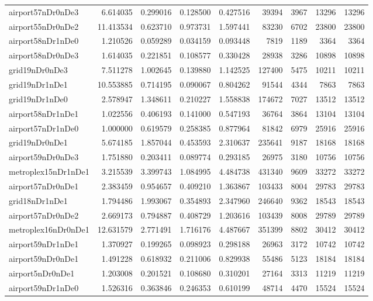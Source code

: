 \begin{longtable}{|l|r|r|r|r|r|r|r|r|}
airport57nDr0nDe3 & 6.614035 & 0.299016 & 0.128500 & 0.427516 & 39394 & 3967 & 13296 & 13296 \\
airport55nDr0nDe2 & 11.413534 & 0.623710 & 0.973731 & 1.597441 & 83230 & 6702 & 23800 & 23800 \\
airport58nDr1nDe0 & 1.210526 & 0.059289 & 0.034159 & 0.093448 & 7819 & 1189 & 3364 & 3364 \\
airport58nDr0nDe3 & 1.614035 & 0.221851 & 0.108577 & 0.330428 & 28938 & 3286 & 10898 & 10898 \\
grid19nDr0nDe3 & 7.511278 & 1.002645 & 0.139880 & 1.142525 & 127400 & 5475 & 10211 & 10211 \\
grid19nDr1nDe1 & 10.553885 & 0.714195 & 0.090067 & 0.804262 & 91544 & 4344 & 7863 & 7863 \\
grid19nDr1nDe0 & 2.578947 & 1.348611 & 0.210227 & 1.558838 & 174672 & 7027 & 13512 & 13512 \\
airport58nDr1nDe1 & 1.022556 & 0.406193 & 0.141000 & 0.547193 & 36764 & 3864 & 13104 & 13104 \\
airport57nDr1nDe0 & 1.000000 & 0.619579 & 0.258385 & 0.877964 & 81842 & 6979 & 25916 & 25916 \\
grid19nDr0nDe1 & 5.674185 & 1.857044 & 0.453593 & 2.310637 & 235641 & 9187 & 18168 & 18168 \\
airport59nDr0nDe3 & 1.751880 & 0.203411 & 0.089774 & 0.293185 & 26975 & 3180 & 10756 & 10756 \\
metroplex15nDr1nDe1 & 3.215539 & 3.399743 & 1.084995 & 4.484738 & 431340 & 9609 & 33272 & 33272 \\
airport57nDr0nDe1 & 2.383459 & 0.954657 & 0.409210 & 1.363867 & 103433 & 8004 & 29783 & 29783 \\
grid18nDr1nDe1 & 1.794486 & 1.993067 & 0.354893 & 2.347960 & 246640 & 9362 & 18543 & 18543 \\
airport57nDr0nDe2 & 2.669173 & 0.794887 & 0.408729 & 1.203616 & 103439 & 8008 & 29789 & 29789 \\
metroplex16nDr0nDe1 & 12.631579 & 2.771491 & 1.716176 & 4.487667 & 351399 & 8802 & 30412 & 30412 \\
airport59nDr1nDe1 & 1.370927 & 0.199265 & 0.098923 & 0.298188 & 26963 & 3172 & 10742 & 10742 \\
airport59nDr0nDe1 & 1.491228 & 0.618932 & 0.211006 & 0.829938 & 55486 & 5123 & 18184 & 18184 \\
airport5nDr0nDe1 & 1.203008 & 0.201521 & 0.108680 & 0.310201 & 27164 & 3313 & 11219 & 11219 \\
airport59nDr1nDe0 & 1.526316 & 0.363846 & 0.246353 & 0.610199 & 48714 & 4470 & 15524 & 15524 \\

\end{longtable}
